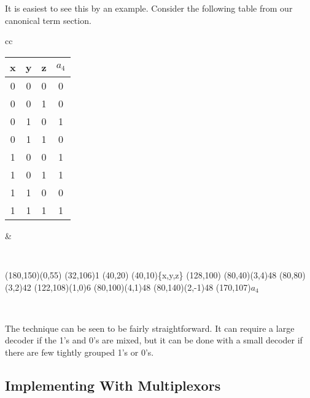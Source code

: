 \vspace{.1in}
It is easiest to see this by an example.  Consider the following table from our canonical term section.

\begin{tabular}{cc}
\begin{tabular}{c|c|c|c}
x & y & z & $a_4$ \\ \hline
0 & 0 & 0 & 0 \\
0 & 0 & 1 & 0 \\
0 & 1 & 0 & 1 \\
0 & 1 & 1 & 0 \\
1 & 0 & 0 & 1 \\
1 & 0 & 1 & 1 \\
1 & 1 & 0 & 0 \\
1 & 1 & 1 & 1 \\
\end{tabular}
&
{\tt    \setlength{\unitlength}{0.92pt}
\begin{picture}(180,150)(0,55)
\put(32,106){1}
\put(40,20){\DecoderEight}
\put(40,10){\{x,y,z\}}
\put(128,100){\OrFour}
\put(80,40){\line(3,4){48}}
\put(80,80){\line(3,2){42}}
\put(122,108){\line(1,0){6}}
\put(80,100){\line(4,1){48}}
\put(80,140){\line(2,-1){48}}
\put(170,107){$a_4$}
\end{picture}} \\
\end{tabular}

The technique can be seen to be fairly straightforward.  It can require a large decoder if the 1's and 0's are mixed, but it can be done with a small decoder if there are few tightly grouped 1's or 0's.

\subsection{Implementing With Multiplexors}

